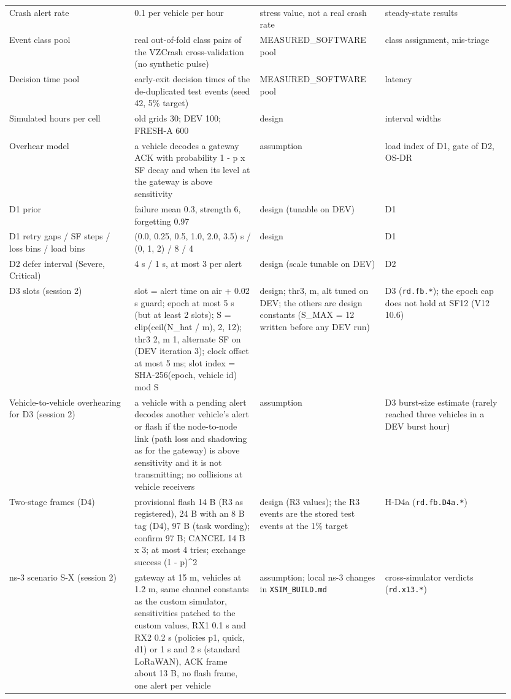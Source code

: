 {\begin{longtable}{p{0.237\linewidth}p{0.237\linewidth}p{0.237\linewidth}p{0.237\linewidth}}
Crash alert rate & 0.1 per vehicle per hour & stress value, not a real crash rate & steady-state results \\
Event class pool & real out-of-fold class pairs of the VZCrash cross-validation (no synthetic pulse) & MEASURED\_SOFTWARE pool & class assignment, mis-triage \\
Decision time pool & early-exit decision times of the de-duplicated test events (seed 42, 5\% target) & MEASURED\_SOFTWARE pool & latency \\
Simulated hours per cell & old grids 30; DEV 100; FRESH-A 600 & design & interval widths \\
Overhear model & a vehicle decodes a gateway ACK with probability 1 - p x SF decay and when its level at the gateway is above sensitivity & assumption & load index of D1, gate of D2, OS-DR \\
D1 prior & failure mean 0.3, strength 6, forgetting 0.97 & design (tunable on DEV) & D1 \\
D1 retry gaps / SF steps / loss bins / load bins & (0.0, 0.25, 0.5, 1.0, 2.0, 3.5) s / (0, 1, 2) / 8 / 4 & design & D1 \\
D2 defer interval (Severe, Critical) & 4 s / 1 s, at most 3 per alert & design (scale tunable on DEV) & D2 \\
D3 slots (session 2) & slot = alert time on air + 0.02 s guard; epoch at most 5 s (but at least 2 slots); S = clip(ceil(N\_hat / m), 2, 12); thr3 2, m 1, alternate SF on (DEV iteration 3); clock offset at most 5 ms; slot index = SHA-256(epoch, vehicle id) mod S & design; thr3, m, alt tuned on DEV; the others are design constants (S\_MAX = 12 written before any DEV run) & D3 (\texttt{rd.fb.*}); the epoch cap does not hold at SF12 (V12 10.6) \\
Vehicle-to-vehicle overhearing for D3 (session 2) & a vehicle with a pending alert decodes another vehicle's alert or flash if the node-to-node link (path loss and shadowing as for the gateway) is above sensitivity and it is not transmitting; no collisions at vehicle receivers & assumption & D3 burst-size estimate (rarely reached three vehicles in a DEV burst hour) \\
Two-stage frames (D4) & provisional flash 14 B (R3 as registered), 24 B with an 8 B tag (D4), 97 B (task wording); confirm 97 B; CANCEL 14 B x 3; at most 4 tries; exchange success (1 - p)\textasciicircum{}2 & design (R3 values); the R3 events are the stored test events at the 1\% target & H-D4a (\texttt{rd.fb.D4a.*}) \\
ns-3 scenario S-X (session 2) & gateway at 15 m, vehicles at 1.2 m, same channel constants as the custom simulator, sensitivities patched to the custom values, RX1 0.1 s and RX2 0.2 s (policies p1, quick, d1) or 1 s and 2 s (standard LoRaWAN), ACK frame about 13 B, no flash frame, one alert per vehicle & assumption; local ns-3 changes in \texttt{XSIM\_BUILD.md} & cross-simulator verdicts (\texttt{rd.x13.*}) \\

\end{longtable}}
